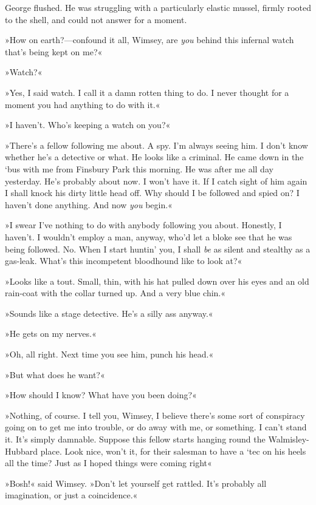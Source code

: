 George flushed. He was struggling with a particularly elastic mussel, firmly rooted to the shell, and could not answer for a moment.

»How on earth?—confound it all, Wimsey, are \textit{you} behind this infernal watch that's being kept on me?«

»Watch?«

»Yes, I said watch. I call it a damn rotten thing to do. I never thought for a moment you had anything to do with it.«

»I haven't. Who's keeping a watch on you?«

»There's a fellow following me about. A spy. I'm always seeing him. I don't know whether he's a detective or what. He looks like a criminal. He came down in the `bus with me from Finsbury Park this morning. He was after me all day yesterday. He's probably about now. I won't have it. If I catch sight of him again I shall knock his dirty little head off. Why should I be followed and spied on? I haven't done anything. And now \textit{you} begin.«

»I swear I've nothing to do with anybody following you about. Honestly, I haven't. I wouldn't employ a man, anyway, who'd let a bloke see that he was being followed. No. When I start huntin' you, I shall \textit{be} as silent and stealthy as a gas-leak. What's this incompetent bloodhound like to look at?«

»Looks like a tout. Small, thin, with his hat pulled down over his eyes and an old rain-coat with the collar turned up. And a very blue chin.«

»Sounds like a stage detective. He's a silly ass anyway.«

»He gets on my nerves.«

»Oh, all right. Next time you see him, punch his head.«

»But what does he want?«

»How should I know? What have you been doing?«

»Nothing, of course. I tell you, Wimsey, I believe there's some sort of conspiracy going on to get me into trouble, or do away with me, or something. I can't stand it. It's simply damnable. Suppose this fellow starts hanging round the Walmisley-Hubbard place. Look nice, won't it, for their salesman to have a `tec on his heels all the time? Just as I hoped things were coming right\longdash«

»Bosh!« said Wimsey. »Don't let yourself get rattled. It's probably all imagination, or just a coincidence.«

